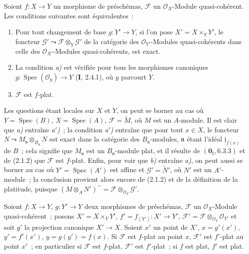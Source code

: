 \begin{proposition}[2.1.3]
\label{IV.2.1.3-fr}
Soient $f:X\to Y$ un morphisme de préschémas, $\mathscr F$ un
$\mathcal O_X$-Module quasi-cohérent. Les conditions suivantes sont
équivalentes~:
\begin{enumerate}
\item[\emph{a)}] Pour tout changement de base $g:Y'\to Y$, si l'on pose
$X'=X\times_Y Y'$, le foncteur
$\mathscr G'\leadsto\mathscr F\otimes_Y\mathscr G'$ de la catégorie des
$\mathcal O_{Y'}$-Modules quasi-cohérents dans celle des
$\mathcal O_{X'}$-Modules quasi-cohérents, est exact.
\item[\emph{a$'$)}] La condition \emph{a)} est vérifiée pour tous les
morphismes canoniques $g:\operatorname{Spec}(\mathcal O_y)\to Y$ \textup{(\textbf{I}, 2.4.1)},
où $y$ parcourt $Y$.
\item[\emph{b)}] $\mathscr F$ est $f$-plat.
\end{enumerate}
\end{proposition}

Les questions étant locales sur $X$ et $Y$, on peut se borner au cas où
$Y=\operatorname{Spec}(B)$, $X=\operatorname{Spec}(A)$,
$\mathscr F=\widetilde M$, où $M$ est un $A$-module. Il est clair que
\emph{a)} entraîne \emph{a$'$)}~; la condition \emph{a$'$)} entraîne que
pour tout $x\in X$, le foncteur $N\leadsto M_{\mathfrak n}\otimes_{B_{\mathfrak n}}N$
est exact dans la catégorie des $B_{\mathfrak n}$-modules, $\mathfrak n$
étant l'idéal $\mathfrak j_{f(x)}$ de $B$~; cela signifie que
$M_{\mathfrak n}$ est un $B_{\mathfrak n}$-module plat, et il résulte de
$(\mathbf{0}_{\mathrm I},6.3.3)$ et de (2.1.2) que $\mathscr F$ est $f$-plat. Enfin,
pour voir que \emph{b)} entraîne \emph{a)}, on peut aussi se borner au cas où
$Y'=\operatorname{Spec}(A')$ est affine et $\mathscr G'=\widetilde{N}'$, où
$N'$ est un $A'$-module~; la conclusion provient alors encore de (2.1.2) et
de la définition de la platitude, puisque
$(M\otimes_A N')^{\sim}=\mathscr F\otimes_{\mathcal O_Y}\mathscr G'$.

\begin{proposition}[2.1.4]
\label{IV.2.1.4-fr}
Soient $f:X\to Y$, $g:Y'\to Y$ deux morphismes de préschémas, $\mathscr F$
un $\mathcal O_X$-Module quasi-cohérent~; posons $X'=X\times_Y Y'$,
$f'=f_{(Y')}:X'\to Y'$, $\mathscr F'=\mathscr F\otimes_{\mathcal O_Y}\mathcal O_{Y'}$
et soit $g'$ la projection canonique $X'\to X$. Soient $x'$ un point de
$X'$, $x=g'(x')$, $y'=f'(x')$, $y=g(y')=f(x)$. Si $\mathscr F$ est $f$-plat
au point $x$, $\mathscr F'$ est $f'$-plat au point $x'$~; en particulier si
$\mathscr F$ est $f$-plat, $\mathscr F'$ est $f'$-plat~; si $f$ est plat,
$f'$ est plat.
\end{proposition}

